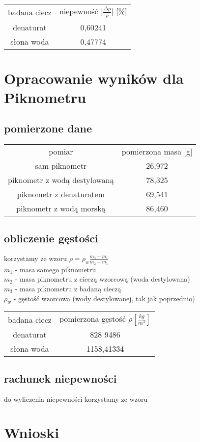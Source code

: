 \documentclass{article}
\begin{document}
\begin{center}
\begin{tabular}{ c | c }
badana ciecz & niepewność |$\frac{\Delta \rho}{\rho}$| [\%] \\
denaturat  & 0,60241\\  
słona woda & 0,47774
\end{tabular}
\end{center}




\section{Opracowanie wyników dla Piknometru}

\subsection{pomierzone dane}
\begin{center}
\begin{tabular}{ c | c }
pomiar & pomierzona masa [g]  \\
sam piknometr &  26,972  \\ 
piknometr z wodą destylowaną& 78,325  \\  
piknometr z denaturatem & 69,541 \\
piknometr z wodą morską & 86,460    
\end{tabular}
\end{center}

\subsection{obliczenie gęstości}

korzystamy ze wzoru $\rho = \rho_w \frac{m_3 - m_1}{m_2 - m_1}$ \\
$m_1$ - masa samego piknometru \\
$m_2$ - masa piknometru z cieczą wzorcową (woda destylowana) \\
$m_3$ - masa piknometru z badaną cieczą \\
$\rho_w$ - gęstość wzorcowa (wody destylowanej, tak jak poprzednio)

\begin{center}
\begin{tabular}{ c | c }
badana ciecz & pomierzona gęstość $\rho [\frac{kg}{m^3}]$\\
 denaturat  & 828 9486 \\  
 słona woda & 1158,41334
\end{tabular}
\end{center}
\subsection{rachunek niepewności}
do wyliczenia niepewności korzystamy ze wzoru \\

\section{Wnioski}
\end{document}
